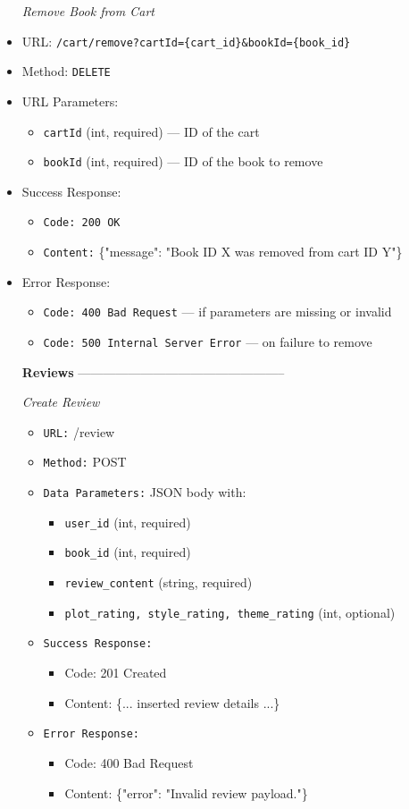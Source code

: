 \begin{itemize}
\item[\textit{Remove Book from Cart}]
\item URL: \texttt{/cart/remove?cartId=\{cart\_id\}&bookId=\{book\_id\}}  
\item Method: \texttt{DELETE}  
\item URL Parameters:
\begin{itemize}
  \item \texttt{cartId} (int, required) — ID of the cart
  \item \texttt{bookId} (int, required) — ID of the book to remove
\end{itemize}
\item Success Response:
\begin{itemize}
  \item \texttt{Code: 200 OK}
  \item \texttt{Content:} \{"message": "Book ID X was removed from cart ID Y"\}
\end{itemize}
\item Error Response:
\begin{itemize}
  \item \texttt{Code: 400 Bad Request} — if parameters are missing or invalid  
  \item \texttt{Code: 500 Internal Server Error} — on failure to remove
\end{itemize}


\item[\textbf{Reviews}] --------------------------------------------------

\item[\textit{Create Review}]
\begin{itemize}
  \item \texttt{URL:} /review  
  \item \texttt{Method:} POST  
  \item \texttt{Data Parameters:} JSON body with:
  \begin{itemize}
    \item \texttt{user\_id} (int, required)
    \item \texttt{book\_id} (int, required)
    \item \texttt{review\_content} (string, required)
    \item \texttt{plot\_rating, style\_rating, theme\_rating} (int, optional)
  \end{itemize}
  \item \texttt{Success Response:}
  \begin{itemize}
    \item Code: 201 Created  
    \item Content: \{... inserted review details ...\}
  \end{itemize}
  \item \texttt{Error Response:}
  \begin{itemize}
    \item Code: 400 Bad Request  
    \item Content: \{"error": "Invalid review payload."\}
  \end{itemize}
\end{itemize}


\end{itemize}

